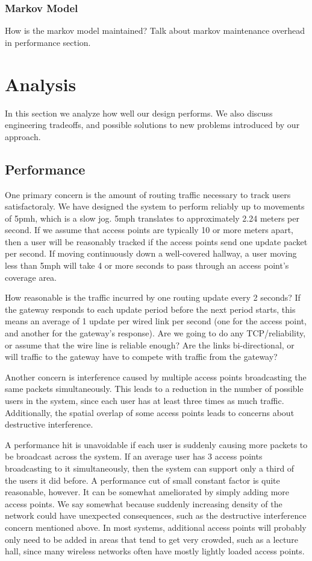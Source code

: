 \documentclass[letterpaper,12pt]{article}
\begin{document}
\subsubsection{Markov Model}
How is the markov model maintained? Talk about markov maintenance overhead
in performance section.

\section{Analysis}

In this section we analyze how well our design performs. We also discuss 
engineering tradeoffs, and possible solutions to new problems introduced by 
our approach.

\subsection{Performance}
One primary concern is the amount of routing traffic necessary to track
users satisfactoraly. We have designed the system to perform reliably
up to movements of 5pmh, which is a slow jog. 5mph translates to approximately
2.24 meters per second. If we assume that access points are typically 10 or more
meters apart, then a user will be reasonably tracked if the access points
send one update packet per second. If moving continuously down a well-covered
hallway, a user moving less than 5mph will take 4 or more seconds to pass
through an access point's coverage area. 

How reasonable is the traffic incurred by one routing update every 2 seconds? 
If the gateway responds to each update period before the next period starts,
this means an average of 1 update per wired link per second (one for the 
access point, and another for the gateway's response). Are we going to do
any TCP/reliability, or assume that the wire line is reliable enough?
Are the links bi-directional, or will traffic to the gateway have to
compete with traffic from the gateway?

Another concern is interference caused by multiple access points broadcasting 
the same packets simultaneously. This leads to a reduction in the number
of possible users in the system, since each user has at least three times
as much traffic. Additionally, the spatial overlap of some access points leads
to concerns about destructive interference. 

A performance hit is unavoidable if each user is suddenly causing more packets
to be broadcast across the system. If an average  user has 3 access points
broadcasting to it simultaneously, then the system can support only a third of
the users it did before. A performance cut of small constant factor is quite
reasonable, however. It can be somewhat ameliorated by simply adding more access 
points. We say somewhat because suddenly increasing density of the network could
have unexpected consequences, such as the destructive interference concern 
mentioned above. In most systems, additional access points will probably only
need to be added in areas that tend to get very crowded, such as a lecture hall,
since many wireless networks often have mostly lightly loaded access points.
\end{document}
